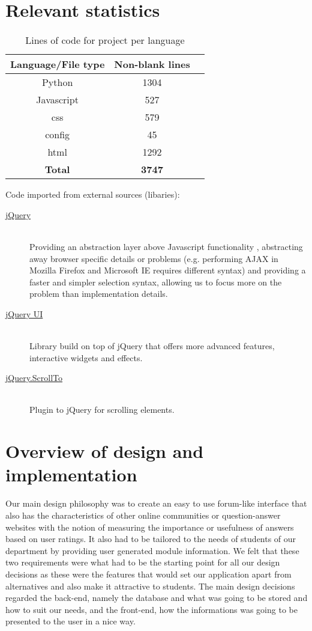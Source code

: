 \documentclass[12pt,a4paper,titlepage]{article}
\begin{document}
\section{Relevant statistics}
\begin{table}[!htbp]
\centering
\begin{tabular}{| c |c |c|}
\hline
\bf{Language/File type} & \bf{Non-blank lines}\\
\hline
Python & 1304\\
\hline
Javascript & 527 \\
\hline
css & 579 \\
\hline
config & 45 \\
\hline
html & 1292\\
\hline
\bf{Total} & \bf{3747}\\
\hline
\end{tabular}
\caption{Lines of code for project per language}
\end{table}
Code imported from external sources (libaries):
\begin{description}
\item[\href{http://jquery.com/}{jQuery}]\hfill\\
Providing an abstraction layer above Javascript functionality , abstracting away browser specific details or problems (e.g. performing AJAX in Mozilla Firefox and Microsoft IE requires different syntax) and providing a faster and simpler selection syntax, allowing us to focus more on the problem than implementation details.
\item[\href{http://jqueryui.com/}{jQuery UI}]\hfill\\
Library build on top of jQuery that offers more advanced features, interactive widgets and effects.
\item[\href{http://flesler.blogspot.co.uk/2007/10/jqueryscrollto.html}{jQuery.ScrollTo}]\hfill\\
Plugin to jQuery for scrolling elements.
\end{description}
\newpage
\section{Overview of design and implementation}

Our main design philosophy was to create an easy to use forum-like interface that also has the characteristics of other online communities or question-answer websites with the notion of measuring the importance or usefulness of answers based on user ratings. It also had to be tailored to the needs of students of our department by providing user generated module information. We felt that these two requirements were what had to be the starting point for all our design decisions as these were the features that would set our application apart from alternatives and also make it attractive to students. The main design decisions regarded the back-end, namely the database and what was going to be stored and how to suit our needs, and the front-end, how the informations was going to be presented to the user in a nice way.\\
\end{document}
